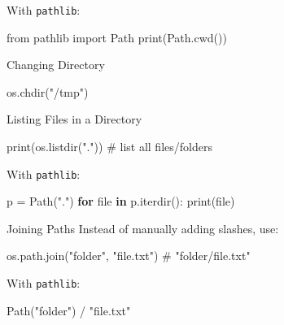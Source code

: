 \documentclass[
  letterpaper,
  DIV=11,
  numbers=noendperiod]{scrreprt}
\newenvironment{Shaded}{\begin{snugshade}}{\end{snugshade}}
\newcommand{\BuiltInTok}[1]{\textcolor[rgb]{0.00,0.23,0.31}{#1}}
\newcommand{\CommentTok}[1]{\textcolor[rgb]{0.37,0.37,0.37}{#1}}
\newcommand{\ControlFlowTok}[1]{\textcolor[rgb]{0.00,0.23,0.31}{\textbf{#1}}}
\newcommand{\ImportTok}[1]{\textcolor[rgb]{0.00,0.46,0.62}{#1}}
\newcommand{\KeywordTok}[1]{\textcolor[rgb]{0.00,0.23,0.31}{\textbf{#1}}}
\newcommand{\NormalTok}[1]{\textcolor[rgb]{0.00,0.23,0.31}{#1}}
\newcommand{\OperatorTok}[1]{\textcolor[rgb]{0.37,0.37,0.37}{#1}}
\newcommand{\StringTok}[1]{\textcolor[rgb]{0.13,0.47,0.30}{#1}}
\begin{document}
With \texttt{pathlib}:

\begin{Shaded}
\begin{Highlighting}[]
\ImportTok{from}\NormalTok{ pathlib }\ImportTok{import}\NormalTok{ Path}
\BuiltInTok{print}\NormalTok{(Path.cwd())}
\end{Highlighting}
\end{Shaded}

Changing Directory

\begin{Shaded}
\begin{Highlighting}[]
\NormalTok{os.chdir(}\StringTok{"/tmp"}\NormalTok{)}
\end{Highlighting}
\end{Shaded}

Listing Files in a Directory

\begin{Shaded}
\begin{Highlighting}[]
\BuiltInTok{print}\NormalTok{(os.listdir(}\StringTok{"."}\NormalTok{))   }\CommentTok{\# list all files/folders}
\end{Highlighting}
\end{Shaded}

With \texttt{pathlib}:

\begin{Shaded}
\begin{Highlighting}[]
\NormalTok{p }\OperatorTok{=}\NormalTok{ Path(}\StringTok{"."}\NormalTok{)}
\ControlFlowTok{for} \BuiltInTok{file} \KeywordTok{in}\NormalTok{ p.iterdir():}
    \BuiltInTok{print}\NormalTok{(}\BuiltInTok{file}\NormalTok{)}
\end{Highlighting}
\end{Shaded}

Joining Paths Instead of manually adding slashes, use:

\begin{Shaded}
\begin{Highlighting}[]
\NormalTok{os.path.join(}\StringTok{"folder"}\NormalTok{, }\StringTok{"file.txt"}\NormalTok{)   }\CommentTok{\# "folder/file.txt"}
\end{Highlighting}
\end{Shaded}

With \texttt{pathlib}:

\begin{Shaded}
\begin{Highlighting}[]
\NormalTok{Path(}\StringTok{"folder"}\NormalTok{) }\OperatorTok{/} \StringTok{"file.txt"}
\end{Highlighting}
\end{Shaded}
\end{document}
